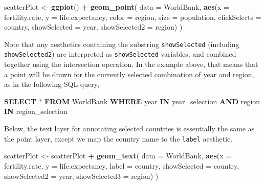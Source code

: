 \documentclass[12pt,]{article}
\newenvironment{Shaded}{\begin{snugshade}}{\end{snugshade}}
\newcommand{\DataTypeTok}[1]{\textcolor[rgb]{0.13,0.29,0.53}{#1}}
\newcommand{\KeywordTok}[1]{\textcolor[rgb]{0.13,0.29,0.53}{\textbf{#1}}}
\newcommand{\NormalTok}[1]{#1}
\newcommand{\OperatorTok}[1]{\textcolor[rgb]{0.81,0.36,0.00}{\textbf{#1}}}
\newcommand{\StringTok}[1]{\textcolor[rgb]{0.31,0.60,0.02}{#1}}
\theoremstyle{definition}
\theoremstyle{definition}
\theoremstyle{definition}
\theoremstyle{remark}
\begin{document}
\begin{Shaded}
\begin{Highlighting}[]
\NormalTok{scatterPlot <-}\StringTok{ }\KeywordTok{ggplot}\NormalTok{() }\OperatorTok{+}\StringTok{ }\KeywordTok{geom_point}\NormalTok{(}
  \DataTypeTok{data =}\NormalTok{ WorldBank,}
  \KeywordTok{aes}\NormalTok{(}\DataTypeTok{x =}\NormalTok{ fertility.rate, }\DataTypeTok{y =}\NormalTok{ life.expectancy,}
      \DataTypeTok{color =}\NormalTok{ region, }\DataTypeTok{size =}\NormalTok{ population,}
      \DataTypeTok{clickSelects =}\NormalTok{ country,}
      \DataTypeTok{showSelected =}\NormalTok{ year,}
      \DataTypeTok{showSelected2 =}\NormalTok{ region)}
\NormalTok{)}
\end{Highlighting}
\end{Shaded}

Note that any aesthetics containing the substring \texttt{showSelected}
(including \texttt{showSelected2}) are interpreted as
\texttt{showSelected} variables, and combined together using the
intersection operation. In the example above, that means that a point
will be drawn for the currently selected combination of year and region,
as in the following SQL query,

\begin{Shaded}
\begin{Highlighting}[]
\KeywordTok{SELECT}\NormalTok{ * }\KeywordTok{FROM}\NormalTok{ WorldBank}
  \KeywordTok{WHERE} \DataTypeTok{year}   \KeywordTok{IN}\NormalTok{ year_selection}
  \KeywordTok{AND}\NormalTok{   region }\KeywordTok{IN}\NormalTok{ region_selection}
\end{Highlighting}
\end{Shaded}

Below, the text layer for annotating selected countries is essentially
the same as the point layer, except we map the country name to the
\texttt{label} aesthetic.

\begin{Shaded}
\begin{Highlighting}[]
\NormalTok{scatterPlot <-}\StringTok{ }\NormalTok{scatterPlot }\OperatorTok{+}\StringTok{ }\KeywordTok{geom_text}\NormalTok{(}
  \DataTypeTok{data =}\NormalTok{ WorldBank,}
  \KeywordTok{aes}\NormalTok{(}\DataTypeTok{x =}\NormalTok{ fertility.rate, }\DataTypeTok{y =}\NormalTok{ life.expectancy,}
      \DataTypeTok{label =}\NormalTok{ country,}
      \DataTypeTok{showSelected =}\NormalTok{ country,}
      \DataTypeTok{showSelected2 =}\NormalTok{ year,}
      \DataTypeTok{showSelected3 =}\NormalTok{ region)}
\NormalTok{)}
\end{Highlighting}
\end{Shaded}
\end{document}
